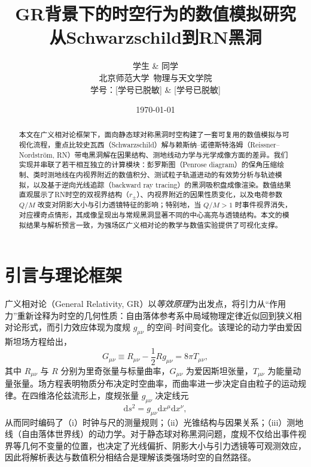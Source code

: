 \documentclass[a4paper,12pt]{article}
\title{\bfseries
GR背景下的时空行为的数值模拟研究\\[0.3em]
\large 从Schwarzschild到RN黑洞}
\author{
学生 \& 同学\\
\small 北京师范大学\ 物理与天文学院\\
\small 学号：[学号已脱敏] \& [学号已脱敏]
}
\date{\small \today}
\begin{document}
\maketitle

\thispagestyle{empty}

\begin{abstract}
本文在广义相对论框架下，面向静态球对称黑洞时空构建了一套可复用的数值模拟与可视化流程，重点比较史瓦西（Schwarzschild）解与赖斯纳--诺德斯特洛姆（Reissner--Nordström, RN）带电黑洞解在因果结构、测地线动力学与光学成像方面的差异。我们实现并串联了若干相互独立的计算模块：彭罗斯图（Penrose diagram）的保角压缩绘制、类时测地线在内视界附近的数值积分、测试粒子轨道进动的有效势分析与轨迹模拟，以及基于逆向光线追踪（backward ray tracing）的黑洞吸积盘成像渲染。数值结果直观展示了RN时空的双视界结构（$r_\pm$）、内视界附近的因果性质变化，以及电荷参数 $Q/M$ 改变对阴影大小与引力透镜特征的影响；特别地，当 $Q/M>1$ 时事件视界消失，对应裸奇点情形，其成像呈现出与常规黑洞显著不同的中心高亮与透镜结构。本文的模拟结果与解析预言一致，为强场区广义相对论的教学与数值实验提供了可视化支撑。
\end{abstract}

\newpage
\tableofcontents
\newpage

\section{引言与理论框架}

广义相对论（General Relativity, GR）以\emph{等效原理}为出发点，将引力从“作用力”重新诠释为时空的几何性质：自由落体参考系中局域物理定律近似回到狭义相对论形式，而引力效应体现为度规 $g_{\mu\nu}$ 的空间--时间变化。该理论的动力学由爱因斯坦场方程给出，
\begin{equation}
G_{\mu\nu}\equiv R_{\mu\nu}-\frac{1}{2}Rg_{\mu\nu}={8\pi}T_{\mu\nu},
\end{equation}
其中 $R_{\mu\nu}$ 与 $R$ 分别为里奇张量与标量曲率，$G_{\mu\nu}$ 为爱因斯坦张量，$T_{\mu\nu}$ 为能量动量张量。场方程表明物质分布决定时空曲率，而曲率进一步决定自由粒子的运动规律。在四维洛伦兹流形上，度规张量 $g_{\mu\nu}$ 决定线元
\begin{equation}
\mathrm{d}s^2=g_{\mu\nu}\mathrm{d}x^\mu \mathrm{d}x^\nu,
\end{equation}
从而同时编码了（i）时钟与尺的测量规则；（ii）光锥结构与因果关系；（iii）测地线（自由落体世界线）的动力学。对于静态球对称黑洞问题，度规不仅给出事件视界等几何不变量的位置，也决定了光线偏折、阴影大小与引力透镜等可观测效应，因此将解析表达与数值积分相结合是理解该类强场时空的自然路径。
\end{document}
